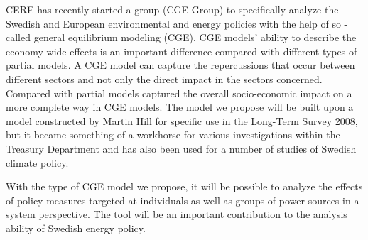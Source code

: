 \documentclass[10pt,a4paper]{article}
\begin{document}
CERE has recently started a group (CGE Group) to specifically analyze the Swedish and European environmental and energy policies with the help of so -called general equilibrium modeling (CGE). CGE models' ability to describe the economy-wide effects is an important difference compared with different types of partial models. A CGE model can capture the repercussions that occur between different sectors and not only the direct impact in the sectors concerned. Compared with partial models captured the overall socio-economic impact on a more complete way in CGE models. The model we propose will be built upon a model constructed by Martin Hill for specific use in the Long-Term Survey 2008, but it became something of a workhorse for various investigations within the Treasury Department and has also been used for a number of studies of Swedish climate policy.

With the type of CGE model we propose, it will be possible to analyze the effects of policy measures targeted at individuals as well as groups of power sources in a system perspective. The tool will be an important contribution to the analysis ability of Swedish energy policy.
\end{document}
